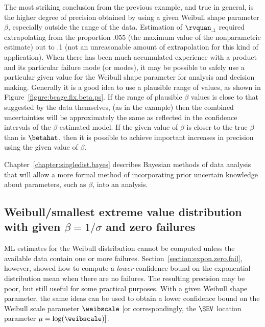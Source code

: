 The most striking conclusion from the previous example, and true in
general, is the higher degree of precision obtained by using a given
Weibull shape parameter $\beta$, especially outside the range of the
data. Estimation of $\rvquan_{.1}$ required extrapolating from the
proportion .055 (the maximum value of the nonparametric estimate)
out to .1 (not an unreasonable amount of extrapolation for this kind
of application).  When there has been much accumulated experience
with a product and its particular failure mode (or modes), it may be
possible to safely use a particular given value for the Weibull
shape parameter for analysis and decision making.  Generally it is a
good idea to use a plausible range of values, as shown in
Figure~\ref{figure:bcage.fix.beta.ps}.  If the range of plausible
$\beta$ values is close to that suggested by the data themselves,
(as in the example) then the combined uncertainties will be
approximately the same as reflected in the confidence intervals of
the $\beta$-estimated model. If the given value of $\beta$ is closer
to the true $\beta$ than is $\betahat$, then it is possible to
achieve important increases in precision using the given value of
$\beta$.

Chapter~\ref{chapter:singledist.bayes} describes Bayesian methods of
data analysis that will allow a more formal method of incorporating
prior uncertain knowledge about parameters, such as $\beta$, into an analysis.

\subsection{Weibull/smallest extreme value distribution with 
given $\beta=1/\sigma$ and zero failures} 
\label{section:weib.zero.fail}
ML estimates for the Weibull distribution cannot be computed unless
the available data contain
one or more failures. Section~\ref{section:expon.zero.fail}, however,
showed how to compute a {\em lower} confidence bound on the
exponential distribution mean when there are no
failures. The resulting precision
may be poor, but still useful for some practical
purposes. With a given  Weibull shape parameter, the
same ideas can be used to obtain a lower confidence bound on the
Weibull scale parameter $\weibscale$ [or correspondingly, the $\SEV$
location parameter $\mu=\log(\weibscale)]$.  

